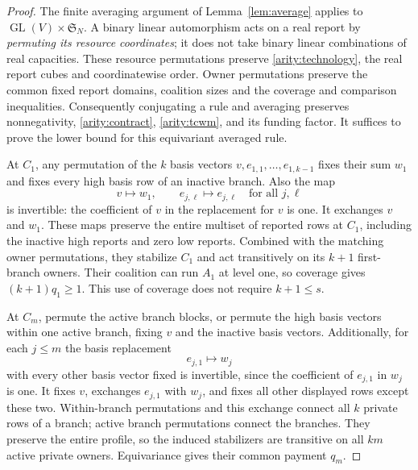 \begin{proof}
The finite averaging argument of Lemma~\ref{lem:average} applies to
$\operatorname{GL}(V)\times\mathfrak S_N$.  A binary linear automorphism
acts on a real report by \emph{permuting its resource coordinates}; it does
not take binary linear combinations of real capacities.  These resource
permutations preserve \eqref{arity:technology}, the real report cubes and
coordinatewise order.  Owner permutations preserve the common fixed report
domains, coalition sizes and the coverage and comparison inequalities.
Consequently conjugating a rule and averaging preserves nonnegativity,
\eqref{arity:contract}, \eqref{arity:tcwm}, and its funding factor.  It
suffices to prove the lower bound for this equivariant averaged rule.

At $C_1$, any permutation of the $k$ basis vectors
$v,e_{1,1},\ldots,e_{1,k-1}$ fixes their sum $w_1$ and fixes every high
basis row of an inactive branch.  Also the map
\[
  v\longmapsto w_1,\qquad e_{j,\ell}\longmapsto e_{j,\ell}
       \quad\text{for all }j,\ell
\]
is invertible: the coefficient of $v$ in the replacement for $v$ is one.
It exchanges $v$ and $w_1$.  These maps preserve the entire multiset of
reported rows at $C_1$, including the inactive high reports and zero low
reports.  Combined with the matching owner permutations, they stabilize
$C_1$ and act transitively on its $k+1$ first-branch owners.  Their coalition
can run $A_1$ at level one, so coverage gives $(k+1)q_1\geq1$.  This use of
coverage does not require $k+1\leq s$.

At $C_m$, permute the active branch blocks, or permute the high basis vectors
within one active branch, fixing $v$ and the inactive basis vectors.
Additionally, for each $j\leq m$ the basis replacement
\[
  e_{j,1}\longmapsto w_j
\]
with every other basis vector fixed is invertible, since the coefficient of
$e_{j,1}$ in $w_j$ is one.  It fixes $v$, exchanges $e_{j,1}$ with $w_j$,
and fixes all other displayed rows except these two.  Within-branch
permutations and this exchange connect all $k$ private rows of a branch;
active branch permutations connect the branches.  They preserve the entire
profile, so the induced stabilizers are transitive on all $km$ active
private owners.  Equivariance gives their common payment $q_m$.
\end{proof}

